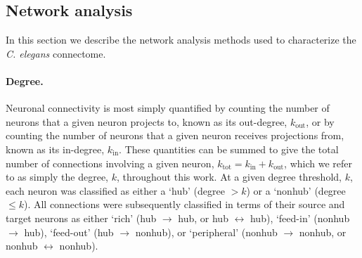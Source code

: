 \documentclass[10pt,letterpaper]{article}
\begin{document}
\subsection*{Network analysis}
In this section we describe the network analysis methods used to characterize the \emph{C. elegans} connectome.

\paragraph{Degree.}
Neuronal connectivity is most simply quantified by counting the number of neurons that a given neuron projects to, known as its out-degree, $k_\mathrm{out}$, or by counting the number of neurons that a given neuron receives projections from, known as its in-degree, $k_\mathrm{in}$.
These quantities can be summed to give the total number of connections involving a given neuron, $k_\mathrm{tot} = k_\mathrm{in} + k_\mathrm{out}$, which we refer to as simply the degree, $k$, throughout this work.
At a given degree threshold, $k$, each neuron was classified as either a `hub' (degree $>k$) or a `nonhub' (degree $\leq k$).
All connections were subsequently classified in terms of their source and target neurons as either
`rich' (hub $\rightarrow$ hub, or hub $\leftrightarrow$ hub),
`feed-in' (nonhub $\rightarrow$ hub),
`feed-out' (hub $\rightarrow$ nonhub),
or `peripheral' (nonhub $\rightarrow$ nonhub, or nonhub $\leftrightarrow$ nonhub).
\end{document}
